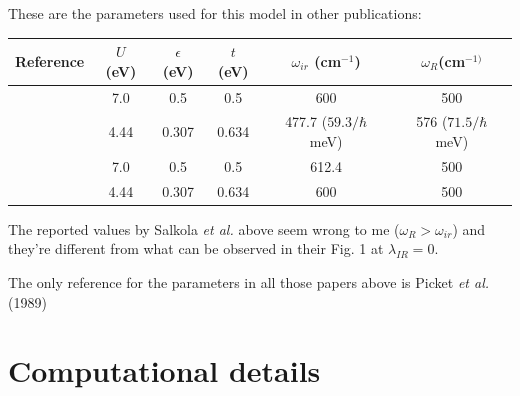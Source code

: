 These are the parameters used for this model in other publications:

\noindent\begin{tabular}{| l | c | c | c | c | c |}
\hline
Reference & $U$ (eV) & $\epsilon$ (eV) & $t$ (eV) & $\omega_{ir}$ (cm$^{-1}$) & $\omega_R$(cm$^{-1)}$ \\
\hline
\cite{MustredeLeon1992} & 7.0 & 0.5 & 0.5 & 600 & 500 \\ 
\cite{Salkola1994, Salkola1995} & 4.44 & 0.307 & 0.634 & 477.7 ($59.3/\hbar$ meV) & 576 ($71.5/\hbar$ meV) \\
\cite{DeLeon1999, Mena2006, Leon2008, MirandaMena2007} & 7.0 & 0.5 & 0.5 & 612.4 & 500 \\ 
\cite{MustredeLeon2000} & 4.44 & 0.307 & 0.634 & 600 & 500 \\
\hline
\end{tabular}

The reported values by Salkola \textit{et al.}\cite{Salkola1994} \cite{Salkola1995} above seem wrong to me ($\omega_R > \omega_{ir}$) and they're different from what can be observed in their Fig. 1 at $\lambda_{IR}=0$.

The only reference for the parameters in all those papers above is Picket \textit{et al.} (1989)

\section{Computational details}
\label{sec:comp_details}